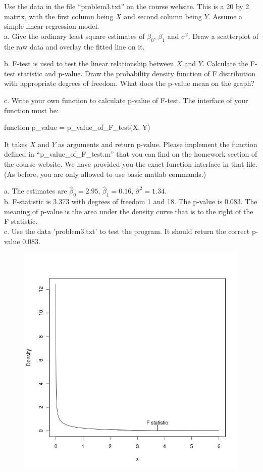 \documentclass[12pt]{article}
\begin{document}
 {
  Use the data in the file ``problem3.txt'' on the course website. This is a 20 by 2 matrix, with the first column being $X$ and second column being $Y$. Assume a simple linear regression model.\\
 a. Give the ordinary least square estimates of $\beta_0$, $\beta_1$ and $\sigma^2$. Draw a scatterplot of the raw data and overlay the fitted line on it.

 b. F-test is used to test the linear relationship between $X$ and $Y$. Calculate the F-test statistic and p-value. Draw the probability density function of F distribution with appropriate degrees of freedom. What does the p-value mean on the graph?

 c. Write your own function to calculate p-value of F-test. The interface of your function must be:

\begin{center}
function p\_value = p\_value\_of\_F\_test(X, Y)
\end{center}

It takes $X$ and $Y$ as arguments and return p-value. Please implement the function defined in ``p\_value\_of\_F\_test.m'' that you can find on the homework section of the course website. We have provided you the exact function interface in that file. (As before, you are only allowed to use basic matlab commands.)
}
 { \vfill
  \ANSWER
} {
a. The estimates are $\hat{\beta}_0 = 2.95$, $\hat{\beta}_1 = 0.16$, $\hat{\sigma}^2 = 1.34.$\\
b. F-statistic is 3.373 with degrees of freedom 1 and 18. The p-value is 0.083. The meaning
of p-value is the area under the density curve that is to the right of the F statistic.\\
c. Use the data 'problem3.txt' to test the program. It should return the correct p-value
0.083.
\begin{figure}[!h]
\begin{center}
\includegraphics[width=.8\textwidth]{plot.jpg}
\end{center}
\end{figure}
}



\problemsdone
\end{document}

